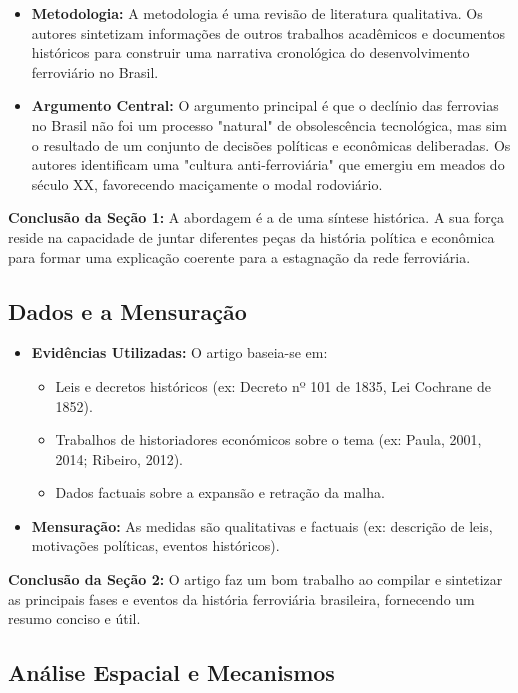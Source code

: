 \documentclass[12pt, a4paper]{article}
\begin{document}
\begin{itemize}
    \item \textbf{Metodologia:} A metodologia é uma revisão de literatura qualitativa. Os autores sintetizam informações de outros trabalhos acadêmicos e documentos históricos para construir uma narrativa cronológica do desenvolvimento ferroviário no Brasil.
    \item \textbf{Argumento Central:} O argumento principal é que o declínio das ferrovias no Brasil não foi um processo "natural" de obsolescência tecnológica, mas sim o resultado de um conjunto de decisões políticas e econômicas deliberadas. Os autores identificam uma "cultura anti-ferroviária" que emergiu em meados do século XX, favorecendo maciçamente o modal rodoviário.
\end{itemize}

\noindent\textbf{Conclusão da Seção 1:} A abordagem é a de uma síntese histórica. A sua força reside na capacidade de juntar diferentes peças da história política e econômica para formar uma explicação coerente para a estagnação da rede ferroviária.

\subsection{Dados e a Mensuração}

\begin{itemize}
    \item \textbf{Evidências Utilizadas:} O artigo baseia-se em:
        \begin{itemize}
            \item Leis e decretos históricos (ex: Decreto nº 101 de 1835, Lei Cochrane de 1852).
            \item Trabalhos de historiadores económicos sobre o tema (ex: Paula, 2001, 2014; Ribeiro, 2012).
            \item Dados factuais sobre a expansão e retração da malha.
        \end{itemize}
    \item \textbf{Mensuração:} As medidas são qualitativas e factuais (ex: descrição de leis, motivações políticas, eventos históricos).
\end{itemize}

\noindent\textbf{Conclusão da Seção 2:} O artigo faz um bom trabalho ao compilar e sintetizar as principais fases e eventos da história ferroviária brasileira, fornecendo um resumo conciso e útil.

\subsection{Análise Espacial e Mecanismos}
\end{document}
